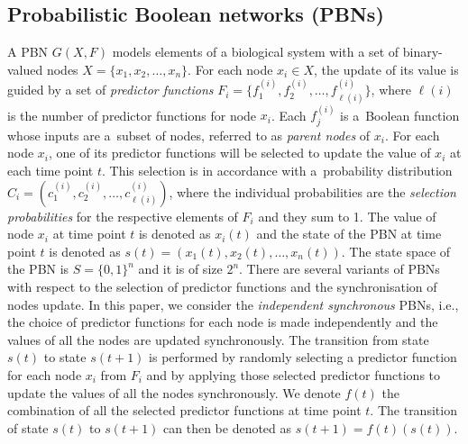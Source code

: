 \documentclass[runningheads,a4paper]{llncs}
\begin{document}
\subsection{Probabilistic Boolean networks (PBNs)}
\label{ssec:pbn}
A PBN $G(X,F)$ models elements of a biological system with a set of binary-valued nodes $X=\{x_1, x_2,\dots, x_n\}$.
For each node $x_i \in X$, the update of its value is guided by a set of \emph{predictor functions} $F_i=\{f_1^{(i)}, f_2^{(i)}, \dots, f_{\ell(i)}^{(i)}\}$,
where $\ell(i)$ is the number of predictor functions for node $x_i$.
Each $f_j^{(i)}$ is a~Boolean function whose inputs are a~subset of nodes, referred to as \emph{parent nodes} of $x_i$.
For each node $x_i$, one of its predictor functions will be selected to update the value of $x_i$ at each time point $t$.
This selection is in accordance with a~probability distribution
$C_i=(c_1^{(i)},c_2^{(i)},\dots,c_{\ell(i)}^{(i)})$, where the individual probabilities are
the \emph{selection probabilities} for the respective elements of $F_i$ and they sum to 1.
The value of node $x_i$ at time point $t$ is denoted as $x_i(t)$
and the state of the PBN at time point $t$ is denoted as $s(t)=(x_1(t),x_2(t),\dots,x_n(t)).$
The state space of the PBN is $S=\{0,1\}^n$ and it is of size $2^n$.
There are several variants of PBNs with respect to the selection of predictor functions and the
synchronisation of nodes update.
In this paper, we consider the \textit{independent synchronous} PBNs,
i.e., the choice of predictor functions for each node is made independently
and the values of all the nodes are updated synchronously.
The transition from state $s(t)$ to state $s(t+1)$ is performed by
randomly selecting a predictor function for each node $x_i$ from $F_i$
and by applying those selected predictor functions to update the values of all the nodes
synchronously.
We denote $f(t)$ the combination of all the selected predictor functions at time point $t$.
The transition of state $s(t)$ to $s(t+1)$ can then be denoted as $s(t+1)=f(t)(s(t)).$
\end{document}
